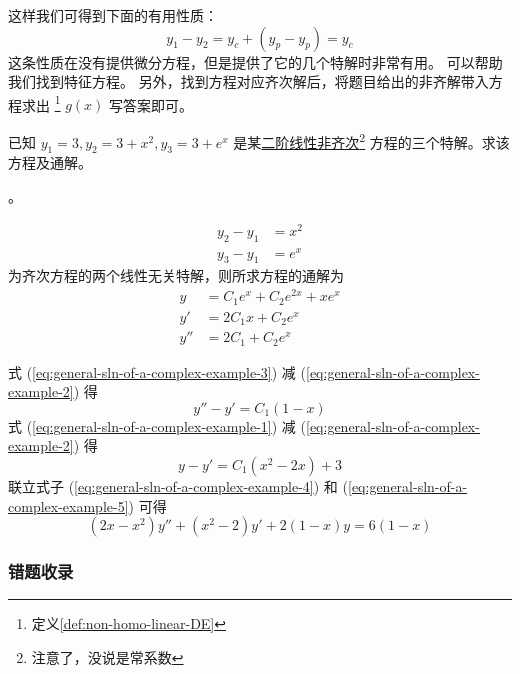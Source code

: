 这样我们可得到下面的有用性质：
\begin{equation}
    y_1 - y_2 = y_c + (y_p - y_p) = y_c
\end{equation}
这条性质在没有提供微分方程，但是提供了它的几个特解时非常有用。
可以帮助我们找到特征方程。
另外，找到方程对应齐次解后，将题目给出的非齐解带入方程求出
\footnote{定义\ref{def:non-homo-linear-DE}}
$g(x)$ 写答案即可。

\begin{example}
    已知 $y_1 = 3, y_2 = 3 + x^2, y_3 = 3 + e^x$
    是某\uline{二阶线性非齐次}\footnote{注意了，没说是常系数}
    方程的三个特解。求该方程及通解。

    \cite[page 145, pdf 156, example 3(7)]{we}。

    \begin{align*}
        y_2 - y_1 &= x^2 \\
        y_3 - y_1 &= e^x 
    \end{align*}
    为齐次方程的两个线性无关特解，则所求方程的通解为
    \begin{align}
        \label{eq:general-sln-of-a-complex-example-1} y  &= C_1 e^x + C_2 e^{2x} + xe^x  \\
        \label{eq:general-sln-of-a-complex-example-2} y' &= 2C_1 x + C_2 e^x \\
        \label{eq:general-sln-of-a-complex-example-3} y''&= 2C_1 + C_2 e^x 
    \end{align}
    
    式 (\ref{eq:general-sln-of-a-complex-example-3}) 减 (\ref{eq:general-sln-of-a-complex-example-2}) 得
    \begin{equation}
        \label{eq:general-sln-of-a-complex-example-4}
        y'' - y' = C_1(1-x)
    \end{equation}
    式 (\ref{eq:general-sln-of-a-complex-example-1}) 减 (\ref{eq:general-sln-of-a-complex-example-2}) 得
    \begin{equation}
        \label{eq:general-sln-of-a-complex-example-5}
        y - y' = C_1(x^2 - 2x) + 3
    \end{equation}
    联立式子 (\ref{eq:general-sln-of-a-complex-example-4}) 和 (\ref{eq:general-sln-of-a-complex-example-5}) 可得
    \[
        (2x - x^2) y'' + (x^2 - 2) y' + 2(1-x)y = 6(1-x)
    \]
\end{example}

\subsubsection{错题收录}

